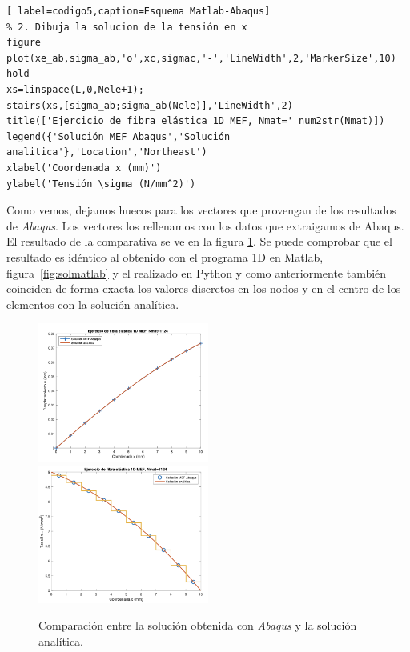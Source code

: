 \documentclass[spanish,a4paper,12pt]{article}
\begin{document}
\begin{itemize}
\begin{lstlisting}[ label=codigo5,caption=Esquema Matlab-Abaqus]
% 2. Dibuja la solucion de la tensión en x
figure
plot(xe_ab,sigma_ab,'o',xc,sigmac,'-','LineWidth',2,'MarkerSize',10)
hold
xs=linspace(L,0,Nele+1);
stairs(xs,[sigma_ab;sigma_ab(Nele)],'LineWidth',2)
title(['Ejercicio de fibra elástica 1D MEF, Nmat=' num2str(Nmat)])
legend({'Solución MEF Abaqus','Solución analitica'},'Location','Northeast')
xlabel('Coordenada x (mm)')
ylabel('Tensión \sigma (N/mm^2)')
\end{lstlisting}

Como vemos, dejamos huecos para los vectores que provengan de los resultados de  \emph{Abaqus}. Los vectores los rellenamos con los datos que extraigamos de Abaqus. El resultado de la comparativa se ve en la figura \ref{fig:out3}. 
Se puede comprobar que el resultado es idéntico al obtenido con el programa 1D en Matlab, figura~\ref{fig:solmatlab} y el realizado en Python y como anteriormente también coinciden de forma exacta los valores discretos en los nodos y en el centro de los elementos con la solución analítica.

\begin{figure}[h!tp]
\centering
\includegraphics[width=0.5\textwidth]{figuras/u-abaqus.png}%
\includegraphics[width=0.5\textwidth]{figuras/s-abaqus.png}
\caption{Comparación entre la solución obtenida con \emph{Abaqus} y la solución analítica.}
\label{fig:out3}%
\end{figure}

\end{itemize}
\end{document}
